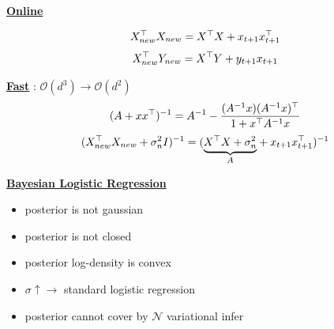 \documentclass[landscape,a0paper,fontscale=0.285]{baposter} %
\newcommand{\compresslist}{ %
\setlength{\itemsep}{1pt}
\setlength{\parskip}{0pt}
\setlength{\parsep}{0pt}
}
\begin{document}
\begin{poster}
{\underline{\textbf{Online}}
\vspace{-0.4cm}

    $$\vspace{-0.2cm}
    X_{new}^\top X_{new} = X^\top X + x_{t+1}x_{t+1}^\top
    $$
    $$\vspace{-0.2cm}
    X_{new}^\top Y_{new} = X^\top Y + y_{t+1} x_{t+1}
    $$


\underline{\textbf{Fast}} : $\mathcal O(d^3) \rightarrow \mathcal O(d^2)$
\vspace{-0.4cm}
    $$\vspace{-0.2cm}
    (A+xx^\top)^{-1} = A^{-1} - \frac{(A^{-1}x)(A^{-1}x)^\top}{1+x^\top A^{-1}x}
    $$
    $$\vspace{-0.2cm}
    (X_{new}^\top X_{new} + \sigma_n^2 I )^{-1} = (\underset{A}{\underbrace{X^\top X + \sigma_n^2}} + x_{t+1}x_{t+1}^\top)^{-1}
    $$

\underline{\textbf{Bayesian Logistic Regression}}
\vspace{-0.2cm}
\begin{itemize}\compresslist
    \item posterior is not gaussian
    \item posterior is not closed 
    \item posterior log-density  is convex
    \item $\sigma\uparrow \rightarrow$ standard logistic regression
    \item posterior cannot cover by $\mathcal N$ variational infer   
\end{itemize}
}


\end{poster}
\end{document}
